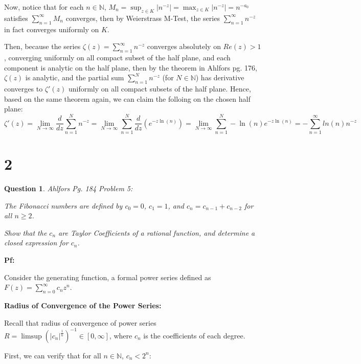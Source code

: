 \documentclass{article}
\newtheorem{question}{Question}
\begin{document}
Now, notice that for each $n\in\mathbb{N}$, $M_n=\sup_{z\in K}|n^{-z}| = \max_{z\in K}|n^{-z}|=n^{-a_0}$ satisfies $\sum_{n=1}^{\infty}M_n$ converges, then by Weierstrass M-Test,
the series $\sum_{n=1}^{\infty}n^{-z}$ in fact converges uniformly on $K$. 

Then, because the series $\zeta(z)=\sum_{n=1}^{\infty}n^{-z}$ converges absolutely on $Re(z)>1$, converging uniformly on all compact subset of the half plane, and each component is analytic on the half plane,
then by the theorem in Ahlfors pg. 176, $\zeta(z)$ is analytic, and the partial sum $\sum_{n=1}^{N}n^{-z}$ (for $N\in\mathbb{N}$) has derivative converges to  $\zeta'(z)$ uniformly on all compact subsets of the half plane.
Hence, based on the same theorem again, we can claim the folloing on the chosen half plane:
$$\zeta'(z)=\lim_{N\rightarrow\infty}\frac{d}{dz}\sum_{n=1}^{N}n^{-z} = \lim_{N\rightarrow\infty}\sum_{n=1}^{N}\frac{d}{dz}(e^{-z\ln(n)}) = \lim_{N\rightarrow\infty}\sum_{n=1}^{N}-\ln(n)e^{-z\ln(n)} = -\sum_{n=1}^{\infty}ln(n)n^{-z}$$

\hfil

\hfil

\section*{2}
\begin{myBox}[]{}
    \begin{question}
        Ahlfors Pg. 184 Problem 5:

        The Fibonacci numbers are defined by $c_0=0$, $c_1=1$, and $c_n=c_{n-1}+c_{n-2}$ for all $n\geq 2$.
        
        Show that the $c_n$ are Taylor Coefficients of a rational function, and determine a closed expression for $c_n$.
    \end{question}
\end{myBox}

\textbf{Pf:}

Consider the generating function, a formal power series defined as $F(z)=\sum_{n=0}^{\infty}c_nz^n$.

\hfil

\textbf{Radius of Convergence of the Power Series:}

Recall that radius of convergence of power series $R=\limsup(|c_n|^{\frac{1}{n}})^{-1}\in [0,\infty]$, where $c_n$ is the coefficients of each degree.

First, we can verify that for all $n\in\mathbb{N}$, $c_n<2^n$:
\end{document}
